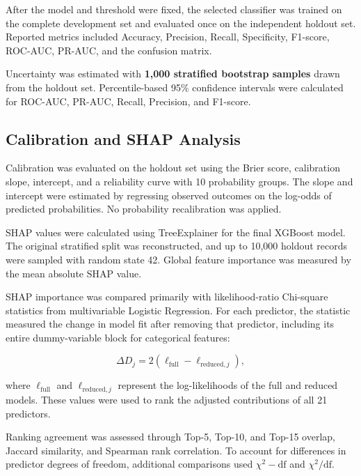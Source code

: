 \documentclass[pdflatex,sn-basic,Numbered]{sn-jnl}
\begin{document}
After the model and threshold were fixed, the selected classifier was
trained on the complete development set and evaluated once on the
independent holdout set.
Reported metrics included Accuracy, Precision, Recall, Specificity,
F1-score, ROC-AUC, PR-AUC, and the confusion matrix.

Uncertainty was estimated with
\textbf{1,000 stratified bootstrap samples} drawn from the holdout set.
Percentile-based 95\% confidence intervals were calculated for ROC-AUC,
PR-AUC, Recall, Precision, and F1-score.



\subsection{Calibration and SHAP Analysis}
\label{subsec:calibration_shap}

Calibration was evaluated on the holdout set using the Brier score, calibration slope, intercept, and a reliability curve with 10 probability groups. The slope and intercept were estimated by regressing observed outcomes on the log-odds of predicted probabilities. No probability recalibration was applied.

SHAP values were calculated using TreeExplainer for the final XGBoost model. The original stratified split was reconstructed, and up to 10,000 holdout records were sampled with random state 42. Global feature importance was measured by the mean absolute SHAP value.

SHAP importance was compared primarily with likelihood-ratio Chi-square statistics from multivariable Logistic Regression. For each predictor, the statistic measured the change in model fit after removing that predictor, including its entire dummy-variable block for categorical features:

\begin{equation}
\Delta D_j =
2\left(
\ell_{\mathrm{full}} -
\ell_{\mathrm{reduced},j}
\right),
\end{equation}

where $\ell_{\mathrm{full}}$ and $\ell_{\mathrm{reduced},j}$ represent the log-likelihoods of the full and reduced models. These values were used to rank the adjusted contributions of all 21 predictors.

Ranking agreement was assessed through Top-5, Top-10, and Top-15 overlap, Jaccard similarity, and Spearman rank correlation. To account for differences in predictor degrees of freedom, additional comparisons used $\chi^2-\mathrm{df}$ and $\chi^2/\mathrm{df}$.
\end{document}
